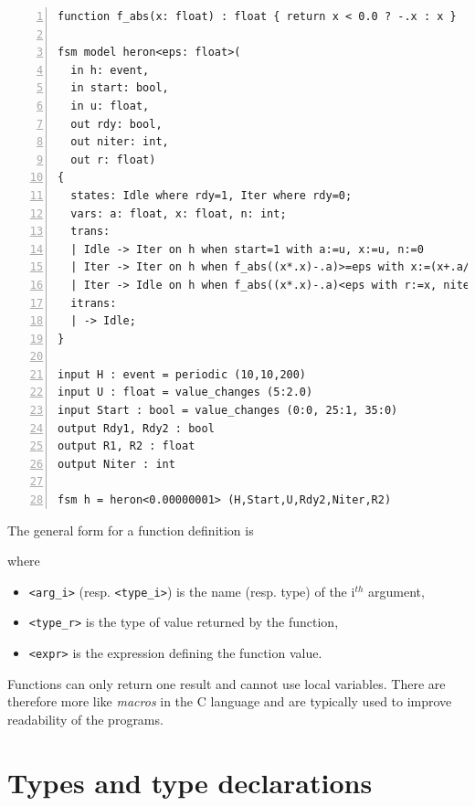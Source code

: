 \begin{lstlisting}[language=Rfsm,frame=single,numbers=left,caption=An RFSM program using a global
  function definition,label={lst:rfsm-heron},float]
function f_abs(x: float) : float { return x < 0.0 ? -.x : x }

fsm model heron<eps: float>(
  in h: event,
  in start: bool,
  in u: float,
  out rdy: bool,
  out niter: int,
  out r: float)
{
  states: Idle where rdy=1, Iter where rdy=0;
  vars: a: float, x: float, n: int;
  trans:
  | Idle -> Iter on h when start=1 with a:=u, x:=u, n:=0
  | Iter -> Iter on h when f_abs((x*.x)-.a)>=eps with x:=(x+.a/.x)/.2., n:=n+1
  | Iter -> Idle on h when f_abs((x*.x)-.a)<eps with r:=x, niter:=n;
  itrans:
  | -> Idle;
}

input H : event = periodic (10,10,200)
input U : float = value_changes (5:2.0)
input Start : bool = value_changes (0:0, 25:1, 35:0)
output Rdy1, Rdy2 : bool
output R1, R2 : float
output Niter : int

fsm h = heron<0.00000001> (H,Start,U,Rdy2,Niter,R2)
\end{lstlisting}

\medskip
\step The general form for a function definition is 

\begin{center}
\end{center}

\noindent
where
\begin{itemize}
\item \lstinline[language=Rfsm]|<arg_i>| (resp. \lstinline[language=Rfsm]|<type_i>|) is the name
  (resp. type) of the i$^{th}$ argument,
\item \lstinline[language=Rfsm]|<type_r>| is the type of value returned by the function,
\item \lstinline[language=Rfsm]|<expr>| is the expression defining the function value.
\end{itemize}

\medskip
\step Functions can only return one result and cannot use local variables. There are therefore more
like \emph{macros} in the C language and are typically used to improve readability of the programs.

\section{Types and type declarations}
\label{sec:types}

